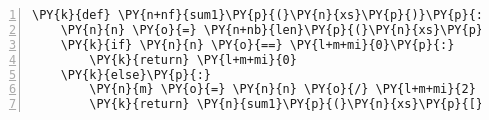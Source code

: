 \begin{Verbatim}[commandchars=\\\{\},numbers=left,firstnumber=1,stepnumber=1,codes={\catcode`\$=3\catcode`\^=7\catcode`\_=8}]
\PY{k}{def} \PY{n+nf}{sum1}\PY{p}{(}\PY{n}{xs}\PY{p}{)}\PY{p}{:}
    \PY{n}{n} \PY{o}{=} \PY{n+nb}{len}\PY{p}{(}\PY{n}{xs}\PY{p}{)}
    \PY{k}{if} \PY{n}{n} \PY{o}{==} \PY{l+m+mi}{0}\PY{p}{:}
        \PY{k}{return} \PY{l+m+mi}{0}
    \PY{k}{else}\PY{p}{:}
        \PY{n}{m} \PY{o}{=} \PY{n}{n} \PY{o}{/} \PY{l+m+mi}{2}  \PY{c}{\PYZsh{} $m = \floor{\frac{n}{2}}$}
        \PY{k}{return} \PY{n}{sum1}\PY{p}{(}\PY{n}{xs}\PY{p}{[}\PY{p}{:}\PY{n}{m}\PY{p}{]}\PY{p}{)} \PY{o}{+} \PY{n}{sum1}\PY{p}{(}\PY{n}{xs}\PY{p}{[}\PY{n}{m}\PY{p}{:}\PY{p}{]}\PY{p}{)}
\end{Verbatim}
